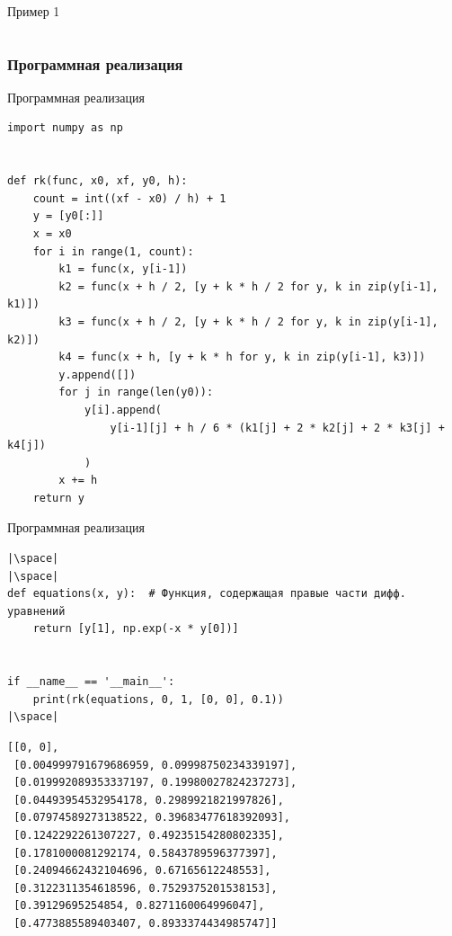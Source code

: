 \documentclass[aspectratio=169, mathserif]{beamer}	%
\begin{document}
\begin{frame}[fragile, label=c]{Пример 1}
\begin{longtable}{|r|r|r|r|r|r|r|r|r|r|r|r|}
	\hline
\end{longtable}
\vfill
\end{frame}


\subsubsection{Программная реализация}
\begin{frame}[fragile, label=c]{Программная реализация}
\scriptsize
\begin{verbatim}
import numpy as np


def rk(func, x0, xf, y0, h):
    count = int((xf - x0) / h) + 1
    y = [y0[:]]
    x = x0
    for i in range(1, count):
        k1 = func(x, y[i-1])
        k2 = func(x + h / 2, [y + k * h / 2 for y, k in zip(y[i-1], k1)])
        k3 = func(x + h / 2, [y + k * h / 2 for y, k in zip(y[i-1], k2)])
        k4 = func(x + h, [y + k * h for y, k in zip(y[i-1], k3)])
        y.append([])
        for j in range(len(y0)):
            y[i].append(
                y[i-1][j] + h / 6 * (k1[j] + 2 * k2[j] + 2 * k3[j] + k4[j])
            )
        x += h
    return y
\end{verbatim}
\vfill
\end{frame}


\begin{frame}[fragile, label=c]{Программная реализация}
\scriptsize
\begin{verbatim}
|\space|
|\space|
def equations(x, y):  # Функция, содержащая правые части дифф. уравнений
    return [y[1], np.exp(-x * y[0])]


if __name__ == '__main__':
    print(rk(equations, 0, 1, [0, 0], 0.1))
|\space|
\end{verbatim}
\vfill
\begin{verbatim}
[[0, 0],
 [0.004999791679686959, 0.09998750234339197],
 [0.019992089353337197, 0.19980027824237273],
 [0.04493954532954178, 0.2989921821997826],
 [0.07974589273138522, 0.39683477618392093],
 [0.1242292261307227, 0.49235154280802335],
 [0.1781000081292174, 0.5843789596377397],
 [0.24094662432104696, 0.67165612248553],
 [0.3122311354618596, 0.7529375201538153],
 [0.39129695254854, 0.8271160064996047],
 [0.4773885589403407, 0.8933374434985747]]
\end{verbatim}
\vfill
\end{frame}
\end{document}

